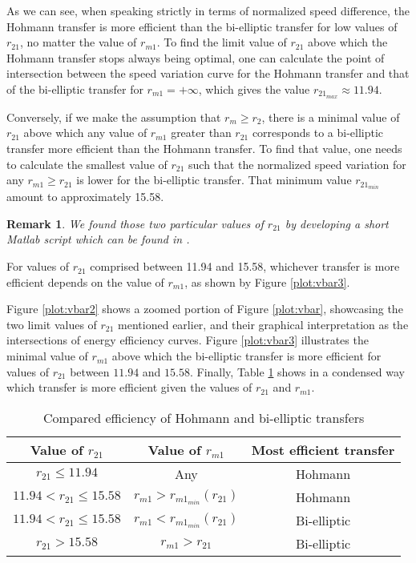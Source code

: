 \documentclass[journal]{IEEEtran}
\newtheorem*{remark}{Remark}
\begin{document}
As we can see, when speaking strictly in terms of normalized speed difference, the Hohmann transfer is more efficient than the bi-elliptic transfer for low values of $r_{21}$, no matter the value of $r_{m1}$. To find the limit value of $r_{21}$ above which the Hohmann transfer stops always being optimal, one can calculate the point of intersection between the speed variation curve for the Hohmann transfer and that of the bi-elliptic transfer for $r_{m1}=+\infty$, which gives the value $r_{{21}_{max}}\approx 11.94$.

Conversely, if we make the assumption that $r_m \geq r_2$, there is a minimal value of 
$r_{21}$ above which any value of $r_{m1}$ greater than $r_{21}$ corresponds to a bi-elliptic transfer more efficient than the Hohmann transfer. To find that value, one needs to calculate the smallest value of $r_{21}$ such that the normalized speed variation for any $r_{m1}\geq r_{21}$ is lower for the bi-elliptic transfer. That minimum value $r_{{21}_{min}}$ amount to approximately 15.58.

\begin{remark}
We found those two particular values of $r_{21}$ by developing a short Matlab script which can be found in \cite{git_program}.
\end{remark}

For values of $r_{21}$ comprised between 11.94 and 15.58, whichever transfer is more efficient depends on the value of $r_{m1}$, as shown by Figure \ref{plot:vbar3}.

Figure \ref{plot:vbar2} shows a zoomed portion of Figure \ref{plot:vbar}, showcasing the two limit values of $r_{21}$ mentioned earlier, and their graphical interpretation as the intersections of energy efficiency curves. Figure \ref{plot:vbar3} illustrates the minimal value of $r_{m1}$ above which the bi-elliptic transfer is more efficient for values of $r_{21}$ between $11.94$ and $15.58$. Finally, Table \ref{table:1} shows in a condensed way which transfer is more efficient given the values of $r_{21}$ and $r_{m1}$.
\begin{table}[h!]
\centering
 \begin{tabular}{| c | c| c |} 
 \hline
 Value of $r_{21}$ & Value of $r_{m1}$ & Most efficient transfer \\
 \hline
 $r_{21} \leq 11.94$ & Any & Hohmann\\
 $11.94 < r_{21}  \leq 15.58$ & $r_{m1} > r_{m1_{min}}(r_{21}) $ &Hohmann\\
 $11.94 < r_{21}  \leq 15.58$ & $r_{m1} < r_{m1_{min}}(r_{21}) $ &Bi-elliptic\\
 $r_{21}> 15.58$ & $r_{m1} > r_{21}$ & Bi-elliptic\\
 \hline
\end{tabular}
\caption{Compared efficiency of Hohmann and bi-elliptic transfers}
\label{table:1}
\end{table}
\end{document}
